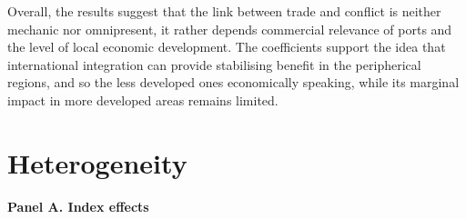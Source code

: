 Overall, the results suggest that the link between trade and conflict is neither mechanic nor omnipresent, it rather depends commercial relevance of ports and the level of local economic development. The coefficients support the idea that international integration can provide stabilising benefit in the peripherical regions, and so the less developed ones economically speaking, while its marginal impact in more developed areas remains limited.\\
\section{Heterogeneity}

\begin{table}[htbp]
	\caption{Regional and sectoral heterogeneity (combined)}
	\label{tab:hetero_all}
	
	\scriptsize
	\setlength{\tabcolsep}{4pt}
	\renewcommand{\arraystretch}{1.05}
	\textbf{Panel A. Index effects} \\
\end{table}
